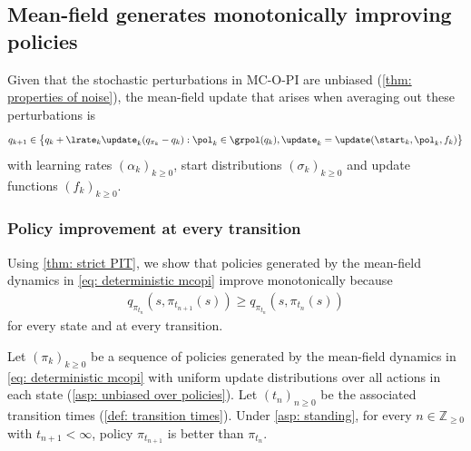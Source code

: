\subsection{Mean-field generates monotonically improving policies}

Given that the stochastic perturbations in MC-O-PI are unbiased (\autoref{thm: properties of noise}),
the mean-field update that arises when averaging out these perturbations is
\begin{align}
\label{eq: deterministic mcopi}
    q_{k+1}
    \in
    \big\{ q_k + \lrate_k \update_k ( q_{\pi_k} - q_k )
    :
    \pol_k \in \grpol(q_k),
    \update_k = \update(\start_k, \pol_k, f_k)
    \big\}
\end{align}
with learning rates $(\alpha_k)_{k\ge 0}$, start distributions $(\sigma_k)_{k\ge 0}$ and update functions $(f_k)_{k\ge 0}$.




































\subsubsection{Policy improvement at every transition}

Using \autoref{thm: strict PIT},
we show that 
policies generated by the mean-field dynamics in \eqref{eq: deterministic mcopi} improve monotonically
because
\begin{align}
\label{eq: strict improvement theorem}
q_{\pi_{t_n}}(s,\pi_{t_{n+1}}(s)) \ge q_{\pi_{t_n}}(s,\pi_{t_n}(s))
\end{align}
for every state and at every transition.


\begin{proposition}
\label{thm: improving policies}
Let \((\pi_k)_{k\ge 0}\) be a sequence of policies generated by the mean-field dynamics in \eqref{eq: deterministic mcopi}
with uniform update distributions over all actions in each state (\autoref{asp: unbiased over policies}).
Let \((t_n)_{n\ge 0}\) be the associated transition times (\autoref{def: transition times}).
Under \autoref{asp: standing},
for every \(n \in \mathbb Z_{\ge 0}\) with \(t_{n+1}<\infty\), policy
\(\pi_{t_{n+1}}\) is better than \(\pi_{t_n}\).
\end{proposition}

